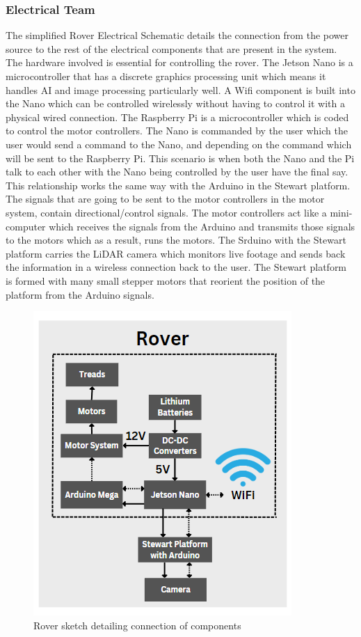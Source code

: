 \documentclass[a4paper, 10pt]{article}
\begin{document}
\pagebreak
\newpage
		\subsubsection*{Electrical Team}
		The simplified Rover Electrical Schematic details the connection from the power source to the rest of the electrical components that are present in the system. The hardware involved is essential for controlling the rover. The Jetson Nano is a microcontroller that has a discrete graphics processing unit which means it handles AI and image processing particularly well. A Wifi component is built into the Nano which can be controlled wirelessly without having to control it with a physical wired connection. The Raspberry Pi is a microcontroller which is coded to control the motor controllers. The Nano is commanded by the user which the user would send a command to the Nano, and depending on the command which will be sent to the Raspberry Pi. This scenario is when both the Nano and the Pi talk to each other with the Nano being controlled by the user have the final say. This relationship works the same way with the Arduino in the Stewart platform. The signals that are going to be sent to the motor controllers in the motor system, contain directional/control signals. The motor controllers act like a mini-computer which receives the signals from the Arduino and transmits those signals to the motors which as a result, runs the motors. The Srduino with the Stewart platform carries the LiDAR camera which monitors live footage and sends back the information in a wireless connection back to the user. The Stewart platform is formed with many small stepper motors that reorient the position of the platform from the Arduino signals.  
		
		\begin{figure} [!h]
			\centering
			\includegraphics[scale= 0.9]{Photos/Rover schematic simplified}
			\caption{Rover sketch detailing connection of components}
			\label{rover_schema}
		\end{figure}
\pagebreak
\clearpage
\newpage
\end{document}
